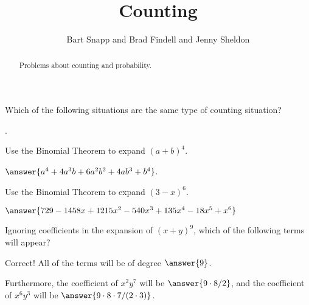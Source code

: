 \documentclass[nooutcomes]{ximera}
\title{Counting}
\author{Bart Snapp and Brad Findell and Jenny Sheldon}
\begin{document}
\begin{abstract}
Problems about counting and probability.
\end{abstract}
\maketitle




\begin{problem}
	Which of the following situations are the same type of counting situation?
	
	\begin{selectAll}
		. 
	\end{selectAll}
\end{problem}


\begin{problem}
Use the Binomial Theorem to expand $(a+b)^4$.
\begin{prompt}
 $\answer{a^4+4a^3b+6a^2b^2+4ab^3+b^4}$. %
\end{prompt}
\end{problem}


\begin{problem}
Use the Binomial Theorem to expand $(3-x)^6$.
\begin{prompt}
 $\answer{729-1458x+1215x^2-540x^3+135x^4-18x^5+x^6}$  %
\end{prompt}
\end{problem}


\begin{problem}
Ignoring coefficients in the expansion of $(x+y)^9$, which of the following terms will appear?
\begin{selectAll}
\end{selectAll}
\begin{problem}
Correct!  All of the terms will be of degree $\answer{9}$.  

Furthermore, the coefficient of $x^2y^7$ will be $\answer{9\cdot 8/2}$, 
and the coefficient of $x^6y^3$ will be $\answer{9\cdot 8\cdot 7/(2\cdot3)}$.
\end{problem}
\end{problem}
\end{document}

